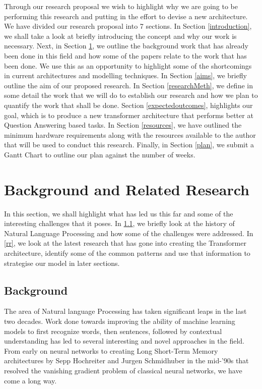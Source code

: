 \documentclass[12pt]{report}
\begin{document}
\begin{appendices}
        Through our research proposal we wish to highlight why we are going to be performing this research and putting in the effort to devise a new architecture. We have divided our research proposal into 7 sections. In Section \ref{introduction}, we shall take a look at briefly introducing the concept and why our work is necessary. Next, in Section \ref{backRR}, we outline the background work that has already been done in this field and how some of the papers relate to the work that has been done. We use this as an opportunity to highlight some of the shortcomings in current architectures and modelling techniques. In Section \ref{aims}, we briefly outline the aim of our proposed research. In Section \ref{researchMeth}, we define in some detail the work that we will do to establish our research and how we plan to quantify the work that shall be done. Section \ref{expectedoutcomes}, highlights our goal, which is to produce a new transformer architecture that performs better at Question Answering based tasks.
        In Section \ref{resources}, we have outlined the minimum hardware requirements along with the resources available to the author that will be used to conduct this research. Finally, in Section \ref{plan}, we submit a Gantt Chart to outline our plan against the number of weeks.

        \section{Background and Related Research}\label{backRR}
        In this section, we shall highlight what has led us this far and some of the interesting challenges that it poses. In \ref{back}, we briefly look at the history of Natural Language Processing and how some of the challenges were addressed. In \ref{rr}, we look at the latest research that has gone into creating the Transformer architecture, identify some of the common patterns and use that information to strategise our model in later sections.

        \subsection{Background}\label{back}

        The area of Natural language Processing has taken significant leaps in the last two decades. Work done towards improving the ability of machine learning models to first recognize words, then sentences, followed by contextual understanding has led to several interesting and novel approaches in the field. From early on neural networks to creating Long Short-Term Memory architectures \citep{originallstm} by Sepp Hochreiter and Jurgen Schmidhuber in the mid-'90s that resolved the vanishing gradient problem of classical neural networks, we have come a long way.


\end{appendices}
\end{document}

